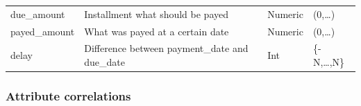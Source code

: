 \documentclass[
]{article}
\begin{document}
\begin{longtable}[]{@{}llll@{}}
\begin{minipage}[t]{0.30\columnwidth}
due\_amount\strut
\end{minipage} & \begin{minipage}[t]{0.30\columnwidth}\raggedright
Installment what should be payed\strut
\end{minipage} & \begin{minipage}[t]{0.11\columnwidth}\raggedright
Numeric\strut
\end{minipage} & \begin{minipage}[t]{0.19\columnwidth}\raggedright
(0,\ldots)\strut
\end{minipage}\tabularnewline
\begin{minipage}[t]{0.30\columnwidth}\raggedright
payed\_amount\strut
\end{minipage} & \begin{minipage}[t]{0.30\columnwidth}\raggedright
What was payed at a certain date\strut
\end{minipage} & \begin{minipage}[t]{0.11\columnwidth}\raggedright
Numeric\strut
\end{minipage} & \begin{minipage}[t]{0.19\columnwidth}\raggedright
(0,\ldots)\strut
\end{minipage}\tabularnewline
\begin{minipage}[t]{0.30\columnwidth}\raggedright
delay\strut
\end{minipage} & \begin{minipage}[t]{0.30\columnwidth}\raggedright
Difference between payment\_date and due\_date\strut
\end{minipage} & \begin{minipage}[t]{0.11\columnwidth}\raggedright
Int\strut
\end{minipage} & \begin{minipage}[t]{0.19\columnwidth}\raggedright
\{-N,\ldots,N\}\strut
\end{minipage}\tabularnewline
\bottomrule
\end{longtable}

\hypertarget{attribute-correlations}{%
\subsubsection{Attribute correlations}\label{attribute-correlations}}
\end{document}
